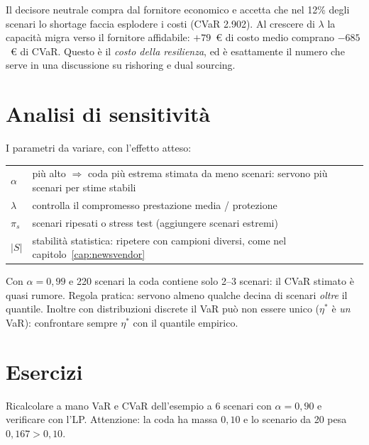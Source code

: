 \begin{insight}
Il decisore neutrale compra dal fornitore economico e accetta che nel 12\% degli
scenari lo shortage faccia esplodere i costi (CVaR 2.902). Al crescere di $\lambda$
la capacità migra verso il fornitore affidabile: $+79$~\euro{} di costo medio
comprano $-685$~\euro{} di CVaR. Questo è il \emph{costo della resilienza}, ed è
esattamente il numero che serve in una discussione su rishoring e dual sourcing.
\end{insight}

\section{Analisi di sensitività}

I parametri da variare, con l'effetto atteso:

\begin{center}\small
\begin{tabular}{lp{9.4cm}}
\toprule
$\alpha$ & più alto $\Rightarrow$ coda più estrema stimata da meno scenari:
           servono più scenari per stime stabili \\
$\lambda$ & controlla il compromesso prestazione media / protezione \\
$\pi_s$ & scenari ripesati o stress test (aggiungere scenari estremi) \\
$|S|$ & stabilità statistica: ripetere con campioni diversi, come nel
        capitolo~\ref{cap:newsvendor} \\
\bottomrule
\end{tabular}
\end{center}

\begin{attenzione}
Con $\alpha = 0{,}99$ e 220 scenari la coda contiene solo 2--3 scenari: il CVaR
stimato è quasi rumore. Regola pratica: servono almeno qualche decina di scenari
\emph{oltre} il quantile. Inoltre con distribuzioni discrete il VaR può non essere
unico ($\eta^*$ è \emph{un} VaR): confrontare sempre $\eta^*$ con il quantile
empirico.
\end{attenzione}

\section{Esercizi}

\begin{esercizio}[verifica]
Ricalcolare a mano VaR e CVaR dell'esempio a 6 scenari con $\alpha = 0{,}90$ e
verificare con l'LP. Attenzione: la coda ha massa $0{,}10$ e lo scenario da 20 pesa
$0{,}167 > 0{,}10$.
\end{esercizio}

